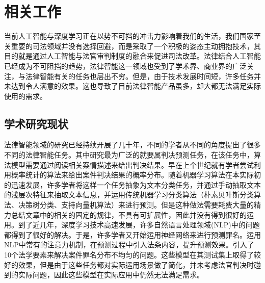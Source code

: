 \chapter{相关工作}
\label{cha:related}
当前人工智能与深度学习正在以势不可挡的冲击力影响着我们的生活，我们国家至关重要的司法领域并没有选择回避，而是采取了一个积极的姿态主动拥抱技术，其目的就是通过人工智能与法官审判制度的融合来促进司法改革。法律结合人工智能已经成为不可阻挡的趋势，法律智能这一领域也受到了学术界、商业界的广泛关注，与法律智能有关的任务也层出不穷。但是，由于技术发展时间短，许多任务并未达到令人满意的效果。这也导致了目前法律智能产品虽多，却大都无法满足实际使用的需求。


\section{学术研究现状}

法律智能领域的研究已经持续开展了几十年，不同的学者从不同的角度提出了很多不同的法律智能任务。其中研究最为广泛的就要属判决预测任务，在该任务中，算法模型需要通过阅读相关案情描述来给出判决结果。早在上个世纪就有学者尝试利用概率统计的算法来给出案件判决结果的概率分布\cite{kort1957predicting,ulmer1963quantitative,segal1984predicting}。随着机器学习算法在本实际初的迅速发展，许多学者将这样一个任务抽象为文本分类任务，并通过手动抽取文本的浅层次特征来抽取文本信息，并运用传统机器学习分类算法（朴素贝叶斯分类算法、决策树分类、支持向量机算法）来进行预测\cite{liu2006exploring,lin2012exploiting,aletras2016predicting}。但是这种做法需要耗费大量的精力总结文章中的相关的固定的规律，不具有可扩展性，因此并没有得到很好的运用。到了近几年，深度学习技术高速发展，许多自然语言处理领域(NLP)中的问题都得到了很好的解决。于是，许多学者又开始运用神经网络来进行预测罪名。\citet{luo2017learning}运用NLP中常有的注意力机制，在预测过程中引入法条内容，提升预测效果。\citet{hu2018few}引入了10个法学要素来解决案件罪名分布不均匀的问题。这些模型在其测试集上取得了较好的效果，但是由于这些任务都对实际运用场景做了简化，并未考虑法官判决时碰到的实际问题，因此这些模型在实际应用中仍然无法满足需求。



